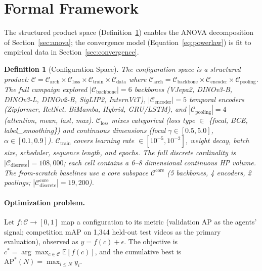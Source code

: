 \documentclass{article}
\newtheorem{definition}{Definition}
\newcommand{\Cspace}{\mathcal{C}}
\newcommand{\E}{\mathbb{E}}
\newcommand{\APstar}{\mathrm{AP}^*}
\begin{document}
\section{Formal Framework}
\label{sec:framework}

The structured product space (Definition~\ref{def:config_space}) enables the ANOVA decomposition of Section~\ref{sec:anova}; the convergence model (Equation~\ref{eq:powerlaw}) is fit to empirical data in Section~\ref{sec:convergence}.

\begin{definition}[Configuration Space]
\label{def:config_space}
The configuration space is a structured product:
$\Cspace = \Cspace_{\mathrm{arch}} \times \Cspace_{\mathrm{loss}} \times \Cspace_{\mathrm{train}} \times \Cspace_{\mathrm{data}}$
where $\Cspace_{\mathrm{arch}} = \Cspace_{\mathrm{backbone}} \times \Cspace_{\mathrm{encoder}} \times \Cspace_{\mathrm{pooling}}$.
The full campaign explored $|\Cspace_{\mathrm{backbone}}| = 6$ backbones (VJepa2, DINOv3-B, DINOv3-L, DINOv2-B, SigLIP2, InternViT), $|\Cspace_{\mathrm{encoder}}| = 5$ temporal encoders (Zipformer, RetNet, BiMamba, Hybrid, GRU/LSTM), and $|\Cspace_{\mathrm{pooling}}| = 4$ (attention, mean, last, max).
$\Cspace_{\mathrm{loss}}$ mixes categorical (loss type $\in$ \{focal, BCE, label\_smoothing\}) and continuous dimensions (focal $\gamma \in [0.5, 5.0]$, $\alpha \in [0.1, 0.9]$).
$\Cspace_{\mathrm{train}}$ covers learning rate $\in [10^{-5}, 10^{-2}]$, weight decay, batch size, scheduler, sequence length, and epochs.
The full discrete cardinality is $|\Cspace_{\mathrm{discrete}}| = 108{,}000$; each cell contains a 6--8 dimensional continuous HP volume.
The from-scratch baselines use a core subspace $\Cspace^{\mathrm{core}}$ (5 backbones, 4 encoders, 2 poolings; $|\Cspace_{\mathrm{discrete}}^{\mathrm{core}}| = 19{,}200$).
\end{definition}

\paragraph{Optimization problem.}
Let $f: \Cspace \to [0, 1]$ map a configuration to its metric (validation AP as the agents' signal; competition mAP on 1{,}344 held-out test videos as the primary evaluation), observed as $y = f(c) + \epsilon$. The objective is $c^* = \arg\max_{c \in \Cspace} \E[f(c)]$, and the cumulative best is $\APstar(N) = \max_{i \leq N} y_i$.
\end{document}
